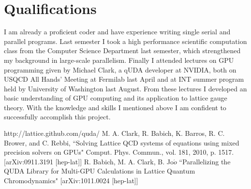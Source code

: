 \documentclass[11pt]{article}
\begin{document}
  \section*{Qualifications} %
  I am already a proficient coder and have experience writing single serial and parallel programs.
  Last semester I took a high performance scientific computation class from the Computer Science Department last semester, which strengthened my background in large-scale parallelism.
  Finally I attended lectures on GPU programming given by Michael Clark, a qUDA developer at NVIDIA, both on USQCD All Hands' Meeting at Fermilab last April and at INT summer program held by University of Washington last August. 
  From these lectures I developed an basic understanding of GPU computing and its application to lattice gauge theory. 
  With the knowledge and skills I mentioned above I am confident to successfully accomplish this project.

%
\begin{thebibliography}{99}
http://lattice.github.com/quda/
M. A. Clark, R. Babich, K. Barros, R. C. Brower, and C. Rebbi,
``Solving Lattice QCD systems of equations using mixed precision solvers on GPUs" Comput. Phys. Commun., vol. 181, 2010, p. 1517. [arXiv:0911.3191 
[hep-lat]]
R. Babich, M. A. Clark, B. Jo$\acute{o}$ ``Parallelizing the QUDA Library for Multi-GPU Calculations in Lattice Quantum Chromodynamics" [arXiv:1011.0024 
[hep-lat]]

\end{thebibliography}
\end{document}
